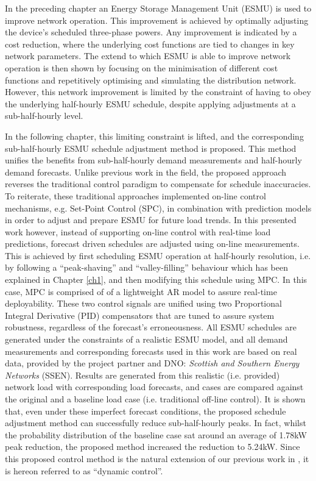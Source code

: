 

In the preceding chapter an Energy Storage Management Unit (ESMU) is used to improve network operation.
This improvement is achieved by optimally adjusting the device's scheduled three-phase powers.
Any improvement is indicated by a cost reduction, where the underlying cost functions are tied to changes in key network parameters.
The extend to which ESMU is able to improve network operation is then shown by focusing on the minimisation of different cost functions and repetitively optimising and simulating the distribution network.
However, this network improvement is limited by the constraint of having to obey the underlying half-hourly ESMU schedule, despite applying adjustments at a sub-half-hourly level.

In the following chapter, this limiting constraint is lifted, and the corresponding sub-half-hourly ESMU schedule adjustment method is proposed.
This method unifies the benefits from sub-half-hourly demand measurements and half-hourly demand forecasts.
Unlike previous work in the field, the proposed approach reverses the traditional control paradigm to compensate for schedule inaccuracies.
To reiterate, these traditional approaches implemented on-line control mechanisms, e.g. Set-Point Control (SPC), in combination with prediction models in order to adjust and prepare ESMU for future load trends.
In this presented work however, instead of supporting on-line control with real-time load predictions, forecast driven schedules are adjusted using on-line measurements.
This is achieved by first scheduling ESMU operation at half-hourly resolution, i.e. by following a ``peak-shaving'' and ``valley-filling'' behaviour which has been explained in Chapter \ref{ch1}, and then modifying this schedule using MPC.
In this case, MPC is comprised of of a lightweight AR model to assure real-time deployability.
These two control signals are unified using two Proportional Integral Derivative (PID) compensators that are tuned to assure system robustness, regardless of the forecast's erroneousness.
All ESMU schedules are generated under the constraints of a realistic ESMU model, and all demand measurements and corresponding forecasts used in this work are based on real data, provided by the project partner and DNO: \textit{Scottish and Southern Energy Networks} (SSEN).
Results are generated from this realistic (i.e. provided) network load with corresponding load forecasts, and cases are compared against the original and a baseline load case (i.e. traditional off-line control).
It is shown that, even under these imperfect forecast conditions, the proposed schedule adjustment method can successfully reduce sub-half-hourly peaks.
In fact, whilst the probability distribution of the baseline case sat around an average of 1.78kW peak reduction, the proposed method increased the reduction to 5.24kW.
Since this proposed control method is the natural extension of our previous work in \cite{Zangs2016}, it is hereon referred to as ``dynamic control''.

